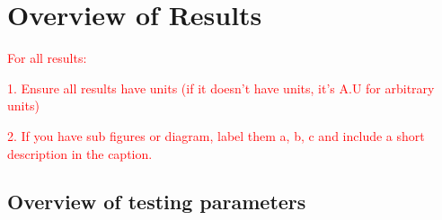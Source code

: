 \section{Overview of Results}

\textcolor{red}{For all results:}

\textcolor{red}{1. Ensure all results have units (if it doesn't have units, it's A.U for arbitrary units)}

\textcolor{red}{2. If you have sub figures or diagram, label them a, b, c and include a short description in the caption.}


\subsection{Overview of testing parameters}

